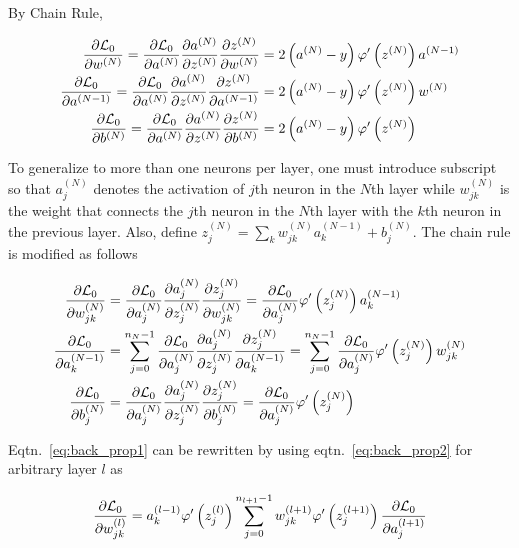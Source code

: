 By Chain Rule,

\begin{align}
    \pdv{\mathcal{L}_0}{w^{(N)}}		      =
    \pdv{\mathcal{L}_0}{a^{(N)}}
    \pdv{a^{(N)}}{z^{(N)}} \pdv{z^{(N)}}{w^{(N)}}    & = 2 \left(a^{(N)} - y
    \right)
    \varphi'
    \left( z^{(N)} \right)  a^{(N-1)}
    \\
    \pdv{\mathcal{L}_0}{a^{(N-1)}}		      =
    \pdv{\mathcal{L}_0}{a^{(N)}}
    \pdv{a^{(N)}}{z^{(N)}} \pdv{z^{(N)}}{a^{(N-1)} } & = 2 \left(a^{(N)} - y
    \right)
    \varphi'
    \left( z^{(N)} \right)  w^{(N)}
    \\
    \pdv{\mathcal{L}_0}{b^{(N)}}		      =
    \pdv{\mathcal{L}_0}{a^{(N)}}
    \pdv{a^{(N)}}{z^{(N)}} \pdv{z^{(N)}}{b^{(N)}}    & = 2 \left(a^{(N)} - y
    \right)
    \varphi'
    \left( z^{(N)} \right)
\end{align}

To generalize to more than one neurons per layer, one must introduce subscript
so that $a^{(N)}_j$ denotes the activation of  $j$th neuron in the $N$th layer
while $w^{(N)}_{jk}$ is the weight that connects the $j$th neuron in the $N$th
layer with the $k$th neuron in the previous layer. Also, define $z^{(N)}_j =
    \sum_k
    w^{(N)}_{jk} a^{(N-1)}_k + b^{(N)}_j$. The chain rule is modified as
follows

\begin{align}
    \pdv{\mathcal{L}_0}{w^{(N)}_{jk}} & =
    \pdv{\mathcal{L}_0}{a^{(N)}_j}
    \pdv{a^{(N)}_j}{z^{(N)}_j} \pdv{z^{(N)}_j}{w^{(N)}_{jk}}  =
    \pdv{\mathcal{L}_0}{a^{(N)}_j}
    \varphi'
    \left( z^{(N)}_j \right)  a^{(N-1)}_k
    \label{eq:back_prop1}
    \\
    \pdv{\mathcal{L}_0}{a^{(N-1)}_k}  & = \sum_{j=0}^{n_N-1}
    \pdv{\mathcal{L}_0}{a^{(N)}_j}
    \pdv{a^{(N)}_j}{z^{(N)}_j} \pdv{z^{(N)}_j}{a^{(N-1)}_k }  =
    \sum_{j=0}^{n_N-1} \pdv{\mathcal{L}_0}{a^{(N)}_j}
    \varphi'
    \left( z^{(N)}_j \right)  w^{(N)}_{jk}
    \label{eq:back_prop2}
    \\
    \pdv{\mathcal{L}_0}{b^{(N)}_j}    & =
    \pdv{\mathcal{L}_0}{a^{(N)}_j}
    \pdv{a^{(N)}_j}{z^{(N)}_j} \pdv{z^{(N)}_j}{b^{(N)}_j}     =
    \pdv{\mathcal{L}_0}{a^{(N)}_j}
    \varphi'
    \left( z^{(N)}_j \right)
\end{align}

Eqtn.~\eqref{eq:back_prop1} can be rewritten by using
eqtn.~\eqref{eq:back_prop2} for arbitrary layer $l$ as

\begin{equation}
    \pdv{\mathcal{L}_0}{w^{(l)}_{jk}} =  a^{(l-1)}_k \varphi'\left( z^{(l)}_j
    \right) \sum_{j=0}^{n_{l+1}-1}
    w^{(l+1)}_{jk} \varphi'
    \left( z^{(l+1)}_j \right)	 \pdv{\mathcal{L}_0}{a^{(l+1)}_j}
\end{equation}

